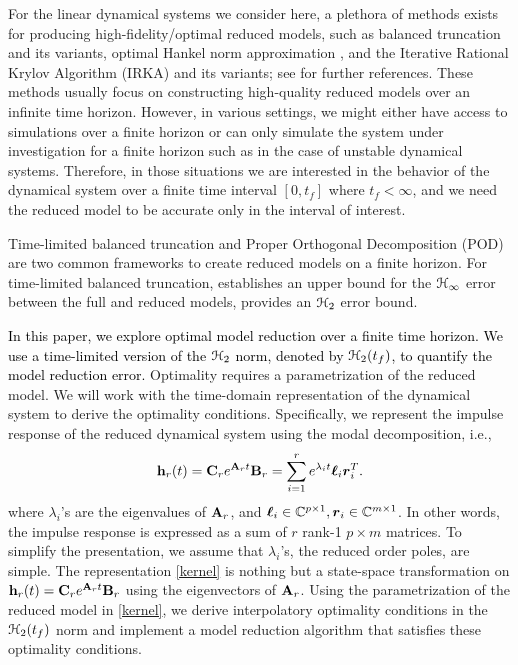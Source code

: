 \documentclass[twocolumn]{autart}
\begin{document}
For the linear dynamical systems we consider here, a plethora of methods exists
for producing high-fidelity/optimal reduced models, such as  balanced truncation \cite{MulR76,Moo81} and its variants, optimal Hankel norm approximation \cite{Glo84}, and the Iterative Rational Krylov Algorithm (IRKA) \cite{GugBA08} and its variants; see \cite{Ant05,BauBF14} for further references.
These methods usually focus on constructing high-quality reduced models  over an infinite time horizon. However, in various settings, we might either have access to simulations over a finite horizon or can only simulate the system under investigation for a finite horizon such as in the case of unstable dynamical systems. Therefore, in those situations we are interested in the behavior of the dynamical system over a finite time interval $[0,t_f]$ where $t_f < \infty$, and we need the reduced model to be accurate only in the interval of interest. 


Time-limited balanced truncation \cite{GawJ90,GugA03,RedK17,Kur17} and Proper Orthogonal Decomposition (POD)   \cite{HolLB96}  are two common frameworks to create reduced models on a finite horizon. 
For time-limited balanced truncation, \cite{GugA03} establishes an upper bound for the $\EuScript{H}_\infty$ error between the full and reduced models,  \cite{RedK17} provides an $\EuScript{H}_2$ error bound. 


  
\textcolor{black}{In this paper,  we explore optimal model reduction over a finite time horizon. We use a time-limited version of the $\EuScript{H}_2$ norm, denoted by $\EuScript{H}_2(t_f)$, to quantify the model reduction error.}
 Optimality requires a parametrization of the reduced model. We will work with the time-domain representation of the dynamical system to derive the optimality conditions. Specifically, we represent the impulse response of the reduced dynamical system using the modal decomposition, i.e.,
 \begin{equation}\label{kernel}
\begin{aligned}
\mathbf{h}_r(t)=\mathbf{C}_r e^{\mathbf{A}_r t}\mathbf{B}_r=\sum_{i=1}^r e^{\lambda_it}\boldsymbol{\ell}_i\boldsymbol{r}_i^T.
\end{aligned}
\end{equation}
where $\lambda_i$'s are the eigenvalues of $\mathbf{A}_r$, and $\boldsymbol{\ell}_i \in \mathbb{C}^{p\times 1}, \boldsymbol{r}_i\in \mathbb{C}^{m\times1}$. 
In other words, the impulse response is expressed as a sum of $r$ rank-1 $p\times m$  matrices.
To simplify the presentation,  we assume  that $\lambda_i$'s, the reduced order poles,  are simple.  The representation \eqref{kernel} 
is nothing but a state-space transformation on $\mathbf{h}_r(t)=\mathbf{C}_r e^{\mathbf{A}_r t}\mathbf{B}_r$ using the eigenvectors of $\mathbf{A}_r$. 
Using the parametrization of the reduced model in \eqref{kernel}, we derive interpolatory optimality conditions in the $\EuScript{H}_2(t_f)$ norm and implement a model reduction algorithm that satisfies these optimality conditions.
\end{document}
